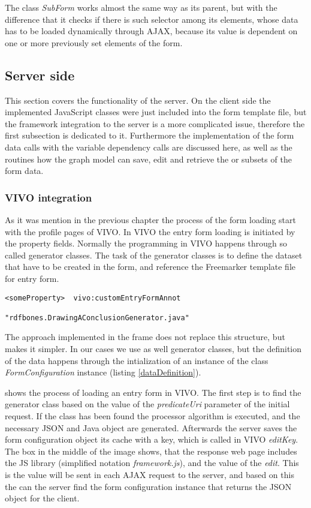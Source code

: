 The class \textit{SubForm} works almost the same way as its parent, but with the difference that it checks if there is such selector among its elements, whose data has to be loaded dynamically through AJAX, because its value is dependent on one or more previously set elements of the form.  

\newpage
\subsection{Server side} 

This section covers the functionality of the server. On the client side the implemented JavaScript classes were just included into the form template file, but the framework integration to the server is a more complicated issue, therefore the first subsection is dedicated to it. Furthermore the implementation of the form data calls with the variable dependency calls are discussed here, as well as the routines how the graph model can save, edit and retrieve the or subsets of the form data.
\label{key}
\subsubsection{VIVO integration}

As it was mention in the previous chapter the process of the form loading start with the profile pages of VIVO. In VIVO the entry form loading is initiated by the property fields. Normally the programming in VIVO happens through so called generator classes. The task of the generator classes is to define the dataset that have to be created in the form, and reference the Freemarker template file for entry form.

\begin{lstlisting}[basicstyle=\footnotesize, frame=single, caption={Custom entry form definition in VIVO}, label=JS_subFormRoutine, captionpos=b, belowskip=1em, aboveskip=2em]
<someProperty>  vivo:customEntryFormAnnot 
										"rdfbones.DrawingAConclusionGenerator.java"
\end{lstlisting}

The approach implemented in the frame does not replace this structure, but makes it simpler. In our cases we use as well generator classes, but the definition of the data happens through the intialization of an instance of the class \textit{FormConfiguration} instance (listing \ref{dataDefinition}). 

 shows the process of loading an entry form in VIVO. The first step is to find the generator class based on the value of the \textit{predicateUri} parameter of the initial request. If the class has been found the processor algorithm is executed, and the necessary JSON and Java object are generated. Afterwards the server saves the form configuration object its cache with a key, which is called in VIVO \textit{editKey}. The box in the middle of the image shows, that the response web page includes the JS library (simplified notation \textit{framework.js}), and the value of the \textit{edit}. This is the value will be sent in each AJAX request to the server, and based on this the can the server find the form configuration instance that returns the JSON object for the client.


